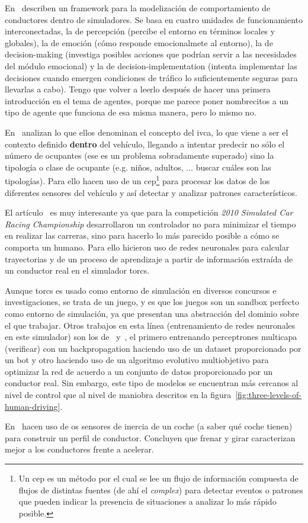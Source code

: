 En~\cite{al2001framework} describen un framework para la modelización de comportamiento de conductores dentro de simuladores. Se basa en cuatro unidades de funcionamiento interconectadas, la de percepción (percibe el entorno en términos locales y globales), la de emoción (cómo responde emocionalmete al entorno), la de decision-making (investiga posibles acciones que podrían servir a las necesidades del módulo emocional) y la de decision-implementation (intenta implementar las decisiones cuando emergen condiciones de tráfico lo suficientemente seguras para llevarlas a cabo). Tengo que volver a leerlo después de hacer una primera introducción en el tema de agentes, porque me parece poner nombrecitos a un tipo de agente que funciona de esa misma manera, pero lo mismo no.

En~\cite{terroso2015complex} analizan lo que ellos denominan el concepto del \gls{ivca}, lo que viene a ser el contexto definido \textbf{dentro} del vehículo, llegando a intentar predecir no sólo el número de ocupantes (ese es un problema sobradamente superado) sino la tipología o clase de ocupante (e.g. niños, adultos, ... \TODO buscar cuáles son las tipologías). Para ello hacen uso de un \gls{cep}\footnote{Un \gls{cep} es un método por el cual se lee un flujo de información compuesta de flujos de distintas fuentes (de ahí el \textit{complex}) para detectar eventos o patrones que pueden indicar la presencia de situaciones a analizar lo más rápido posible.} para procesar los datos de los diferentes sensores del vehículo y así detectar y analizar patrones característicos.

El artículo~\cite{munoz2010human} es muy interesante ya que para la competición \textit{2010 Simulated Car Racing Championship} desarrollaron un controlador no para minimizar el tiempo en realizar las carreras, sino para hacerlo lo más parecido posible a cómo se comporta un humano. Para ello hicieron uso de redes neuronales para calcular trayectorias y de un proceso de aprendizaje a partir de información extraída de un conductor real en el simulador \gls{torcs}.

Aunque \gls{torcs} es usado como entorno de simulación en diversos concursos e investigaciones, se trata de un juego, y es que los juegos son un sandbox perfecto como entorno de simulación, ya que presentan una abstracción del dominio sobre el que trabajar. Otros trabajos en esta línea (entrenamiento de redes neuronales en este simulador) son los de~\cite{munoz2009controller} y~\cite{van2009robust}, el primero entrenando perceptrones multicapa (\TODO verificar) con un backpropagation haciendo uso de un dataset proporcionado por un bot y otro haciendo uso de un algoritmo evolutivo multiobjetivo para optimizar la red de acuerdo a un conjunto de datos proporcionado por un conductor real. Sin embargo, este tipo de modelos se encuentran más cercanos al nivel de control que al nivel de maniobra descritos en la figura~\ref{fig:three-levels-of-human-driving}.

En~\cite{van2013driver} hacen uso de os sensores de inercia de un coche (a saber qué coche tienen) para construir un perfil de conductor. Concluyen que frenar y girar caracterizan mejor a los conductores frente a acelerar.